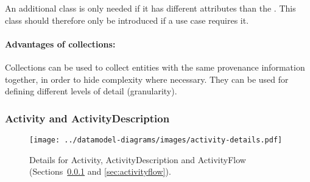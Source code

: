 An additional class  is only 
needed if it has different attributes than 
the . This class should therefore only be introduced if a use case requires it.

\paragraph{Advantages of collections:} Collections can be used to collect entities with the same provenance information together, 
    in order to hide complexity where necessary. They can be used for defining 
    different levels of detail (granularity).


\subsubsection{Activity and ActivityDescription}
\label{sec:activity}

\begin{figure}[h]
\centering
\texttt{[image: ../datamodel-diagrams/images/activity-details.pdf]}
\caption[Details for Activity, ActivityDescription and ActivityFlow]{Details for Activity, ActivityDescription and ActivityFlow (Sections~\ref{sec:activity} and \ref{sec:activityflow}).
}
\label{fig:activity-details}
\end{figure}

